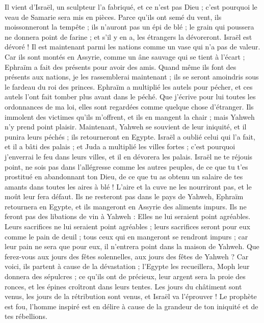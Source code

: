 \begin{multicols}{2}
Il vient d'Israël, un sculpteur l'a fabriqué, et ce n'est pas Dieu ; c'est pourquoi le veau de Samarie sera mis en pièces.
Parce qu'ils ont semé du vent, ils moissonneront la tempête ; ils n’auront pas un épi de blé ; le grain qui poussera ne donnera point de farine ; et s'il y en a, les étrangers la dévoreront.
Israël est dévoré ! Il est maintenant parmi les nations comme un vase qui n’a pas de valeur.
Car ils sont montés en Assyrie, comme un âne sauvage qui se tient à l’écart ; Ephraïm a fait des présents pour avoir des amis.
Quand même ils font des présents aux nations, je les rassemblerai maintenant ; ils se seront amoindris sous le fardeau du roi des princes.
Ephraïm a multiplié les autels pour pécher, et ces autels l’ont fait tomber plus avant dans le péché.
Que j’écrive pour lui toutes les ordonnances de ma loi, elles sont regardées comme quelque chose d’étranger.
Ils immolent des victimes qu’ils m’offrent, et ils en mangent la chair ; mais Yahweh n’y prend point plaisir. Maintenant, Yahweh se souvient de leur iniquité, et il punira leurs péchés ; ils retourneront en Egypte.
Israël a oublié celui qui l'a fait, et il a bâti des palais ; et Juda a multiplié les villes fortes ; c'est pourquoi j'enverrai le feu dans leurs villes, et il en dévorera les palais.
\VerseOne{}Israël ne te réjouis point, ne sois pas dans l’allégresse comme les autres peuples, de ce que tu t’es prostitué en abandonnant ton Dieu, de ce que tu as obtenu un salaire de tes amants dans toutes les aires à blé !
L'aire et la cuve ne les nourriront pas, et le moût leur fera défaut.
Ils ne resteront pas dans le pays de Yahweh, Ephraïm retournera en Egypte, et ils mangeront en Assyrie des aliments impurs.
Ils ne feront pas des libations de vin à Yahweh : Elles ne lui seraient point agréables. Leurs sacrifices ne lui seraient point agréables ; leurs sacrifices seront pour eux comme le pain de deuil ; tous ceux qui en mangeront se rendront impurs ; car leur pain ne sera que pour eux, il n'entrera point dans la maison de Yahweh.
Que ferez-vous aux jours des fêtes solennelles, aux jours des fêtes de Yahweh ?
Car voici, ils partent à cause de la dévastation ; l'Egypte les recueillera, Moph leur donnera des sépulcres ; ce qu’ils ont de précieux, leur argent sera la proie des ronces, et les épines croîtront dans leurs tentes.
Les jours du châtiment sont venus, les jours de la rétribution sont venus, et Israël va l’éprouver ! Le prophète est fou, l’homme inspiré est en délire à cause de la grandeur de ton iniquité et de tes rébellions.

\end{multicols}
